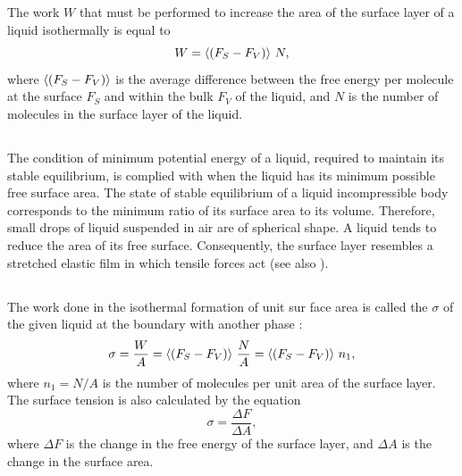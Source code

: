 The work $W$ that must be performed to increase the area of the surface layer of a liquid isothermally is equal to
\begin{equation*}%
W = \expval{(F_{S} - F_{V})} \, N,
\end{equation*}
where $\expval{(F_{S} - F_{V})}$ is the average difference between the free energy  per molecule at the surface $F_{S}$ and within the bulk $F_{V}$ of the liquid, and $N$ is the number of molecules in the surface layer of the liquid.

\subsection{}\label{13.4.3} The condition of minimum potential energy of a liquid, required to maintain its stable equilibrium, is complied with when the liquid has its minimum possible free surface area. The state of stable equilibrium of a liquid incompressible body corresponds to the minimum ratio of its surface area to its volume. Therefore, small drops of liquid suspended in air are of spherical shape. A liquid tends to reduce the area of its free surface. Consequently, the surface layer resembles a stretched elastic film in which tensile forces act (see also ).

\subsection{}\label{13.4.4} The work done in the isothermal formation of unit sur­ face area is called the  $\sigma$ of the given liquid at the boundary with another phase :
\begin{equation*}%
\sigma = \frac{W}{A} = \expval{(F_{S} - F_{V})} \, \frac{N}{A} = \expval{(F_{S} - F_{V})} \,n_{1},
\end{equation*}
where $n_{1} = N/A$ is the number of molecules per unit area of the surface layer. The surface tension is also calculated by the equation 
\begin{equation*}%
\sigma = \frac{\Delta F }{\Delta A},
\end{equation*}
where $\Delta F$ is the change in the free energy of the surface layer, and $\Delta A$ is the change in the surface area.


